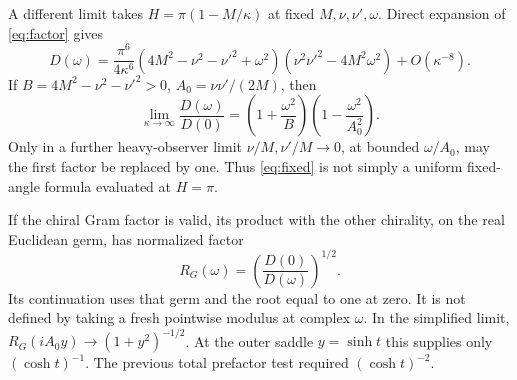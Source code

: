 \documentclass[11pt,a4paper]{article}
\begin{document}
A different limit takes \(H=\pi(1-M/\kappa)\) at fixed
\(M,\nu,\nu',\omega\). Direct expansion of \eqref{eq:factor} gives
\begin{equation}
 D(\omega)=\frac{\pi^6}{4\kappa^6}
 (4M^2-\nu^2-\nu'^2+\omega^2)
 (\nu^2\nu'^2-4M^2\omega^2)+O(\kappa^{-8}).
 \label{eq:recoil}
\end{equation}
If \(B=4M^2-\nu^2-\nu'^2>0\), \(A_0=\nu\nu'/(2M)\), then
\begin{equation}
 \lim_{\kappa\to\infty}\frac{D(\omega)}{D(0)}
 =\left(1+\frac{\omega^2}{B}\right)
  \left(1-\frac{\omega^2}{A_0^2}\right). \label{eq:recoilratio}
\end{equation}
Only in a further heavy-observer limit
\(\nu/M,\nu'/M\to0\), at bounded \(\omega/A_0\), may the first
factor be replaced by one. Thus \eqref{eq:fixed} is not simply a
uniform fixed-angle formula evaluated at \(H=\pi\).

If the chiral Gram factor is valid, its product with the other chirality,
on the real Euclidean germ, has normalized factor
\begin{equation}
 R_G(\omega)=\left(\frac{D(0)}{D(\omega)}\right)^{1/2}.
 \label{eq:RG}
\end{equation}
Its continuation uses that germ and the root equal to one at zero.
It is not defined by taking a fresh pointwise modulus at complex
\(\omega\). In the simplified limit,
\(R_G(iA_0 y)\to(1+y^2)^{-1/2}\). At the outer saddle
\(y=\sinh t\) this supplies only \((\cosh t)^{-1}\).
The previous total prefactor test required \((\cosh t)^{-2}\).
\end{document}
